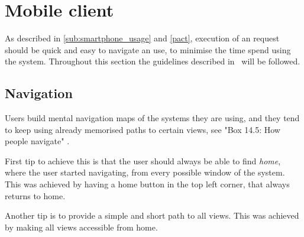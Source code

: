 \section{Mobile client}

As described in \cref{sub:smartphone_usage} and \cref{pact}, execution
of an request should be quick and easy to navigate an use, to minimise
the time spend using the system. Throughout this section the
guidelines described in~\cite{DEB} will be followed.

\subsection{Navigation}

Users build mental navigation maps of the systems they are using, and
they tend to keep using already memorised paths to certain views, see
"Box 14.5: How people navigate" \cite{DEB}. 

First tip to achieve this is that the user should always be able to find \emph{home}, where the user started navigating, from every possible window of the system. This was achieved by having a home button in the top left corner, that always returns to home.

Another tip is to provide a simple and short path to all views. This was achieved by making all views accessible from home.

